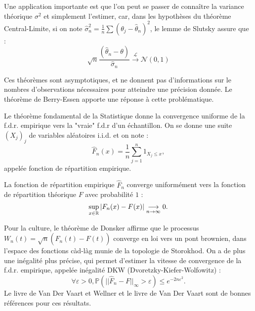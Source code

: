 Une application importante est que l'on peut se passer de connaître la variance théorique $\sigma^2$ et simplement l'estimer, car, dans les hypothèses du théorème Central-Limite, si on note $\hat\sigma_n^2 =\frac{1}{n}\sum (\theta_j -\hat{\theta}_n)^2$, le lemme de Slutsky assure que :
\[\sqrt{n}\frac{(\hat\theta_n - \theta)}{\hat\sigma_n} \overset{\mathcal L}{\longrightarrow} \mathcal N(0,1)\]

Ces théorèmes sont asymptotiques, et ne donnent pas d'informations sur le nombres d'observations nécessaires pour atteindre une précision donnée. Le théorème de Berry-Essen apporte une réponse à cette problématique.\\

\begin{thm}
\end{thm}
 
Le théorème fondamental de la Statistique donne la convergence uniforme de la f.d.r. empirique vers la "vraie" f.d.r d'un échantillon. On se donne une suite $(X_j)_j$ de variables aléatoires i.i.d. et on note : 
\[\hat F_n(x) = \frac{1}{n} \sum_{j=1}^n 1_{X_j\leq x},\]
appelée fonction de répartition empirique.

\begin{thm}
La fonction de répartition empirique $\hat F_n$ converge uniformément vers la fonction de répartition théorique $F$ avec probabilité $1$ :
\[\sup_{x\in \mathbb R} |F_n(x)-F(x)| \underset{n\to\infty}{\longrightarrow} 0.\]
\end{thm}

Pour la culture, le théorème de Donsker affirme que le processus $W_n(t) = \sqrt{n}(\hat F_n(t)-F(t))$ converge en loi vers un pont brownien, dans l'espace des fonctions càd-làg munie de la topologie de Storokhod. On a de plus une inégalité plus précise, qui permet d'estimer la vitesse de convergence de la f.d.r. empirique, appelée inégalité DKW (Dvoretzky-Kiefer-Wolfowitz) :
\[\forall \varepsilon>0, \mathbb{P}(||\hat F_n -F||_\infty>\varepsilon)\leq e^{-2n\varepsilon^2}.\] 
Le livre de Van Der Vaart et Wellner \cite{VDVWellner} et le livre de Van Der Vaart \cite{VDV} sont de bonnes références pour ces résultats. 
